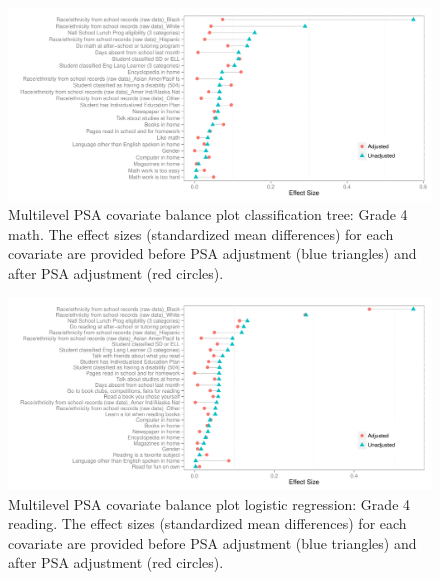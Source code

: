 \begin{figure}[h!]
\begin{center}
\includegraphics[width=\textwidth]{../Figures2009/g4math-mlpsa-ctree-balance.pdf}
\caption[Multilevel PSA covariate balance plot classification tree: Grade 4 math]{Multilevel PSA covariate balance plot classification tree: Grade 4 math. The effect sizes (standardized mean differences) for each covariate are provided before PSA adjustment (blue triangles) and after PSA adjustment (red circles).}
\end{center}
\end{figure}

\begin{figure}[h!]
\begin{center}
\includegraphics[width=\textwidth]{../Figures2009/g4read-mlpsa-lr-balance.pdf}
\caption[Multilevel PSA covariate balance plot logistic regression: Grade 4 reading]{Multilevel PSA covariate balance plot logistic regression: Grade 4 reading. The effect sizes (standardized mean differences) for each covariate are provided before PSA adjustment (blue triangles) and after PSA adjustment (red circles).}
\end{center}
\end{figure}

